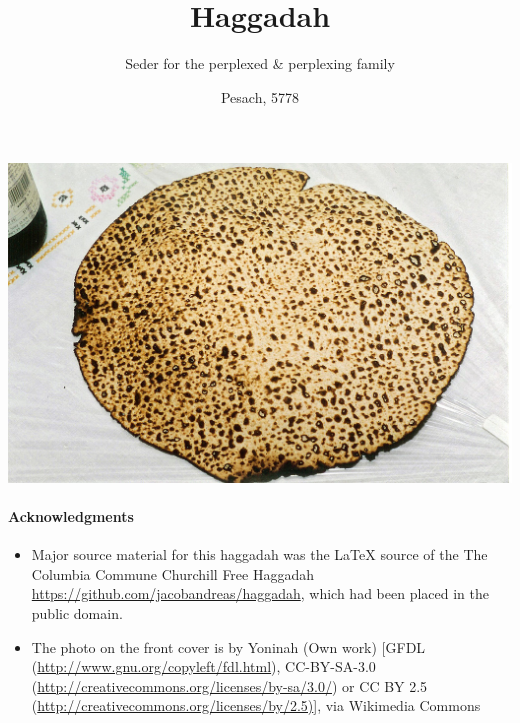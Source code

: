 \documentclass[a4paper,12pt,openany]{memoir}
\title{\vspace*{-2cm}\Huge Haggadah}
\author{\huge Seder for the perplexed \&  perplexing family}
\date{\Large Pesach, 5778}
\begin{document}
\frontmatter
{}\afterpage{\restorepagecolor}
\maketitle

\noindent\hspace*{-5cm}
\includegraphics[width=232mm]{figs/matzo.jpg}
\thispagestyle{empty}



\newpage

\phantom{Deliberately blank}
\thispagestyle{empty}

\newpage
\setcounter{page}{1}
\maketitle

\newpage
\vfill\phantom{Hello}\vfill

\vfill
\paragraph*{Acknowledgments}

\begin{itemize}
\item Major  source material for this haggadah was the {\LaTeX}
  source of the The Columbia Commune Churchill Free Haggadah
  \url{https://github.com/jacobandreas/haggadah}, which had been
  placed in the public domain.
\item The photo on the
  front cover is by Yoninah (Own work) [GFDL
  (\url{http://www.gnu.org/copyleft/fdl.html}), CC-BY-SA-3.0
  (\url{http://creativecommons.org/licenses/by-sa/3.0/}) or CC BY 2.5
  (\url{http://creativecommons.org/licenses/by/2.5)}], via Wikimedia
  Commons
\end{itemize}
\end{document}

